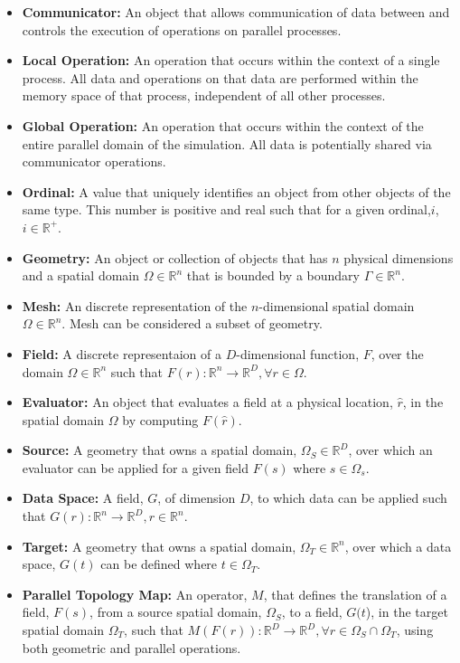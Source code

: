 \documentclass[letterpaper,12pt]{article}
\begin{document}
\begin{itemize}
\item {\bf Communicator:} An object that allows communication of data
  between and controls the execution of operations on parallel
  processes.
\item {\bf Local Operation:} An operation that occurs within the
  context of a single process. All data and operations on that data
  are performed within the memory space of that process, independent
  of all other processes.
\item {\bf Global Operation:} An operation that occurs within the
  context of the entire parallel domain of the simulation. All data is
  potentially shared via communicator operations.
\item {\bf Ordinal:} A value that uniquely identifies an object from
  other objects of the same type. This number is positive and real
  such that for a given ordinal,$i$, $i \in \mathbb{R}^+$.
\item {\bf Geometry:} An object or collection of objects that has $n$
  physical dimensions and a spatial domain $\Omega \in \mathbb{R}^n$
  that is bounded by a boundary $\Gamma \in \mathbb{R}^n$.
\item {\bf Mesh:} An discrete representation of the $n$-dimensional
  spatial domain $\Omega \in \mathbb{R}^n$. Mesh can be considered a
  subset of geometry.
\item {\bf Field:} A discrete representaion of a $D$-dimensional
  function, $F$, over the domain $\Omega \in \mathbb{R}^n$ such that
  $F(r) : \mathbb{R}^n \rightarrow \mathbb{R}^D, \forall r \in
  \Omega$.
\item {\bf Evaluator:} An object that evaluates a field at a physical
  location, $\hat{r}$, in the spatial domain $\Omega$ by computing
  $F(\hat{r})$.
\item {\bf Source:} A geometry that owns a spatial domain, $\Omega_S
  \in \mathbb{R}^D$, over which an evaluator can be applied for a
  given field $F(s)$ where $s \in \Omega_s$.
\item {\bf Data Space:} A field, $G$, of dimension $D$, to which data
  can be applied such that $G(r) : \mathbb{R}^n \rightarrow
  \mathbb{R}^D, r \in \mathbb{R}^n$.
\item {\bf Target:} A geometry that owns a spatial domain, $\Omega_T
  \in \mathbb{R}^n$, over which a data space, $G(t)$ can be defined
  where $t \in \Omega_T$.
\item{ \bf Parallel Topology Map:} An operator, $M$, that defines the
  translation of a field, $F(s)$, from a source spatial domain,
  $\Omega_S$, to a field, $G(t$), in the target spatial domain
  $\Omega_T$, such that $M( F(r) ) : \mathbb{R}^D \rightarrow
  \mathbb{R}^D, \forall r \in \Omega_S \cap \Omega_T$, using both
  geometric and parallel operations.
\end{itemize}
\end{document}
